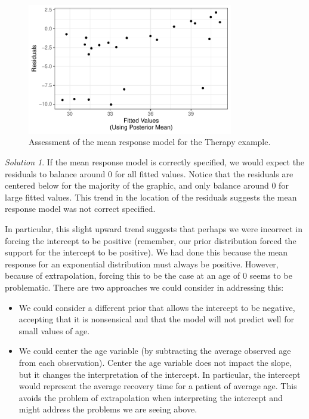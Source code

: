 \documentclass[
  letterpaper,
  DIV=11,
  numbers=noendperiod]{scrreprt}
\providecommand{\tightlist}{%
  \setlength{\itemsep}{0pt}\setlength{\parskip}{0pt}}\usepackage{longtable,booktabs,array}
\theoremstyle{definition}
\theoremstyle{plain}
\theoremstyle{definition}
\theoremstyle{remark}
\newtheorem*{solution}{Solution}
\begin{document}
\begin{figure}

{\centering \includegraphics[width=0.8\textwidth,height=\textheight]{./images/fig-mean0-1.pdf}

}

\caption{\label{fig-mean0}Assessment of the mean response model for the
Therapy example.}

\end{figure}

\begin{solution}

If the mean response model is correctly specified, we would expect the
residuals to balance around 0 for all fitted values. Notice that the
residuals are centered below for the majority of the graphic, and only
balance around 0 for large fitted values. This trend in the location of
the residuals suggests the mean response model was not correct
specified.

In particular, this slight upward trend suggests that perhaps we were
incorrect in forcing the intercept to be positive (remember, our prior
distribution forced the support for the intercept to be positive). We
had done this because the mean response for an exponential distribution
must always be positive. However, because of extrapolation, forcing this
to be the case at an age of 0 seems to be problematic. There are two
approaches we could consider in addressing this:

\begin{itemize}
\tightlist
\item
  We could consider a different prior that allows the intercept to be
  negative, accepting that it is nonsensical and that the model will not
  predict well for small values of age.
\item
  We could center the age variable (by subtracting the average observed
  age from each observation). Center the age variable does not impact
  the slope, but it changes the interpretation of the intercept. In
  particular, the intercept would represent the average recovery time
  for a patient of average age. This avoids the problem of extrapolation
  when interpreting the intercept and might address the problems we are
  seeing above.
\end{itemize}

\end{solution}
\end{document}
